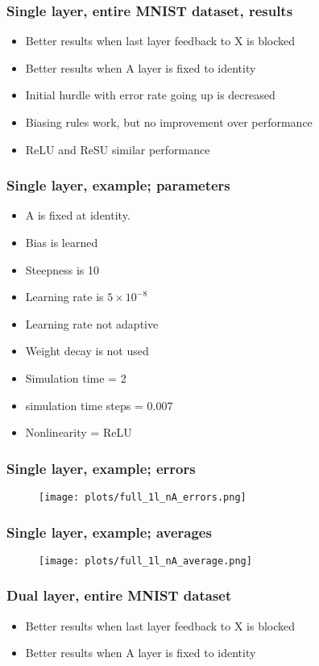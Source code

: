 \documentclass{beamer}
\begin{document}
\begin{frame}
	\frametitle{Single layer, entire MNIST dataset, results}
	\begin{itemize}
		\item Better results when last layer feedback to X is blocked
		\item Better results when A layer is fixed to identity
		\item Initial hurdle with error rate going up is decreased
		\item Biasing rules work, but no improvement over performance
		\item ReLU and ReSU similar performance
	\end{itemize}
\end{frame}
\begin{frame}
	\frametitle{Single layer, example; parameters}
	\begin{itemize}
		\item A is fixed at identity.
		\item Bias is learned
		\item Steepness is 10
		\item Learning rate is $5 \times 10^{-8}$
		\item Learning rate not adaptive
		\item Weight decay is not used
		\item Simulation time = 2
		\item simulation time steps = 0.007
		\item Nonlinearity = ReLU
	\end{itemize}
\end{frame}
\begin{frame}
	\frametitle{Single layer, example; errors}
	\begin{figure}
		\texttt{[image: plots/full\_1l\_nA\_errors.png]}
	\end{figure}
\end{frame}
\begin{frame}
	\frametitle{Single layer, example; averages}
	\begin{figure}
		\texttt{[image: plots/full\_1l\_nA\_average.png]}
	\end{figure}
\end{frame}

\begin{frame}
	\frametitle{Dual layer, entire MNIST dataset}
	\begin{itemize}
		\item Better results when last layer feedback to X is blocked
		\item Better results when A layer is fixed to identity
	\end{itemize}
\end{frame}
\end{document}
